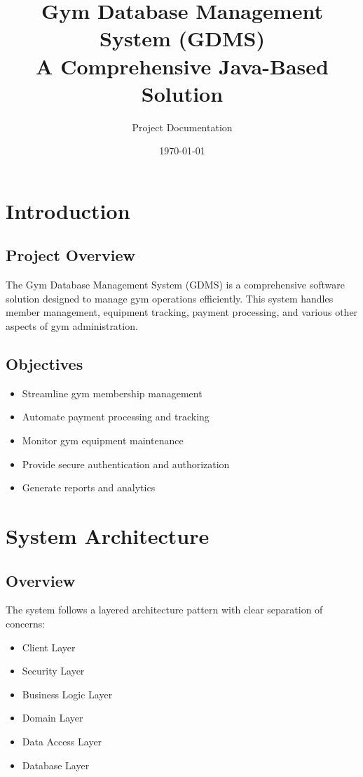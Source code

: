 \documentclass[12pt,a4paper]{report}
\begin{document}
\title{
    {\Huge Gym Database Management System (GDMS)}\\
    \large A Comprehensive Java-Based Solution
}
\author{Project Documentation}
\date{\today}

\maketitle
\tableofcontents

\chapter{Introduction}
\section{Project Overview}
The Gym Database Management System (GDMS) is a comprehensive software solution designed to manage gym operations efficiently. This system handles member management, equipment tracking, payment processing, and various other aspects of gym administration.

\section{Objectives}
\begin{itemize}
    \item Streamline gym membership management
    \item Automate payment processing and tracking
    \item Monitor gym equipment maintenance
    \item Provide secure authentication and authorization
    \item Generate reports and analytics
\end{itemize}

\chapter{System Architecture}
\section{Overview}
The system follows a layered architecture pattern with clear separation of concerns:

\begin{itemize}
    \item Client Layer
    \item Security Layer
    \item Business Logic Layer
    \item Domain Layer
    \item Data Access Layer
    \item Database Layer
\end{itemize}
\end{document}
